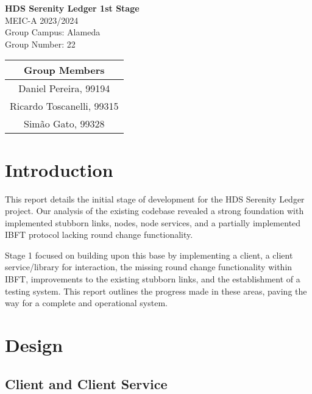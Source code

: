 \documentclass[12pt]{article}
\begin{document}
\begin{titlepage}
    \vspace*{\fill}
    \centering
    \LARGE\textbf{HDS Serenity Ledger 1st Stage}\\
    \vspace{2em}
    \LARGE
    MEIC-A 2023/2024\\
    Group Campus: Alameda\\
    Group Number: 22\\
    \vspace{2em}
    \begin{tabular}{|c|}
        \hline
        Group Members\\
        \hline
        Daniel Pereira, 99194\\
        Ricardo Toscanelli, 99315\\
        Simão Gato, 99328\\
        \hline
    \end{tabular}
    \vspace{2em}
    \vspace*{\fill}
\end{titlepage}

\tableofcontents
\newpage

\section{Introduction}
This report details the initial stage of development for the HDS Serenity Ledger project. Our analysis of the existing codebase revealed a strong foundation with implemented stubborn links, nodes, node services, and a partially implemented IBFT protocol lacking round change functionality.

Stage 1 focused on building upon this base by implementing a client, a client service/library for interaction, the missing round change functionality within IBFT, improvements to the existing stubborn links, and the establishment of a testing system. This report outlines the progress made in these areas, paving the way for a complete and operational system.

\section{Design}

\subsection{Client and Client Service}
\end{document}
